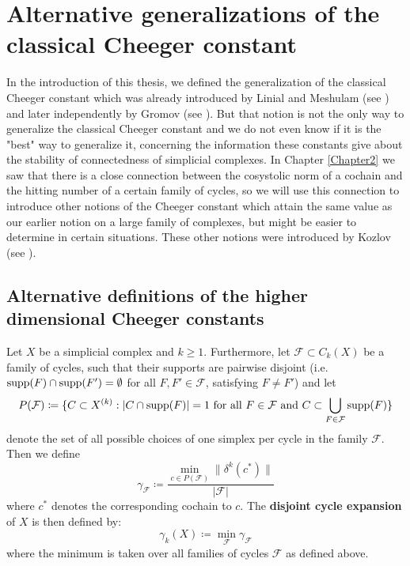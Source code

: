 
\chapter{Alternative generalizations of the classical Cheeger constant}

\label{Chapter6}

In the introduction of this thesis, we defined the generalization of the classical Cheeger constant which was already introduced by Linial and Meshulam (see \cite{2}) and later independently by Gromov (see \cite{3}). But that notion is not the only way to generalize the classical Cheeger constant and we do not even know if it is the "best" way to generalize it, concerning the information these constants give about the stability of connectedness of simplicial complexes. In Chapter \ref{Chapter2} we saw that there is a close connection between the cosystolic norm of a cochain and the hitting number of a certain family of cycles, so we will use this connection to introduce other notions of the Cheeger constant which attain the same value as our earlier notion on a large family of complexes, but might be easier to determine in certain situations. These other notions were introduced by Kozlov (see \cite{13}).

\section{Alternative definitions of the higher dimensional Cheeger constants}

\begin{defi}
Let \(X\) be a simplicial complex and \(k\geq 1\). Furthermore, let \(\mathcal{F}\subset C_k(X)\) be a family of cycles, such that their supports are pairwise disjoint (i.e. \(\mathrm{supp}(F)\cap\mathrm{supp}(F')=\emptyset\) for all \(F,F'\in\mathcal{F}\), satisfying \(F\neq F'\)) and let
\[
P(\mathcal{F})\coloneqq\{C\subset X^{(k)}:|C\cap\mathrm{supp}(F)|=1\text{ for all }F\in\mathcal{F}\text{ and }C\subset\bigcup\limits_{F\in\mathcal{F}}\mathrm{supp}(F)\}
\]
denote the set of all possible choices of one simplex per cycle in the family \(\mathcal{F}\). Then we define
\[
\gamma_{\mathcal{F}}\coloneqq\frac{\min\limits_{c\in P(\mathcal{F})}\|\delta^k(c^*)\|}{|\mathcal{F}|}
\]
where \(c^*\) denotes the corresponding cochain to \(c\). The \textbf{disjoint cycle expansion} of \(X\) is then defined by:
\[
\gamma_k(X)\coloneqq\min\limits_{\mathcal{F}}\gamma_{\mathcal{F}}
\]
where the minimum is taken over all families of cycles \(\mathcal{F}\) as defined above.
\end{defi}

